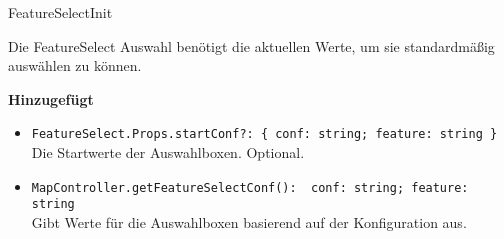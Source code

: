 \begin{Change}{FeatureSelectInit}
    
    Die FeatureSelect Auswahl benötigt die aktuellen Werte, um sie standardmäßig auswählen zu können.
    
    \bigskip
    \textbf{Hinzugefügt}
    \begin{itemize}
        \item \texttt{FeatureSelect.Props.startConf?: \{ conf: string; feature: string \}}
        \\ Die Startwerte der Auswahlboxen. Optional.
        \item \texttt{MapController.getFeatureSelectConf(): { conf: string; feature: string }}
        \\ Gibt Werte für die Auswahlboxen basierend auf der Konfiguration aus.
    \end{itemize}

\end{Change}

